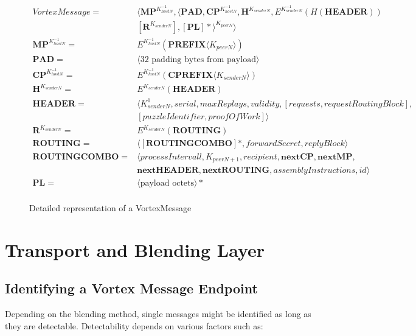 \begin{figure*}[!h]
	\begin{align}
VortexMessage                = &\langle \mathbf{MP}^{K^{-1}_{hostN}}, \langle\mathbf{PAD}, \mathbf{CP}^{K^{-1}_{hostN}}, \mathbf{H}^{K_{senderN}}, E^{K^{-1}_{senderN}}\left(H\left(\mathbf{HEADER}\right)\right)  \nonumber \\
                               & \left[\mathbf{R}^{K_{senderN}}\right], \left[\mathbf{PL}\right]*\rangle^{K_{peerN}} \rangle\label{eq:vortexMessage}\\ 
\mathbf{MP}^{K^{-1}_{hostN}}  = &E^{K^{-1}_{hostN}}\left(\mathbf{PREFIX}\langle K_{peerN}\rangle \right)\\ 
\mathbf{PAD}                 = &\langle \text{32 padding bytes from payload} \rangle\\ 
\mathbf{CP}^{K^{-1}_{hostN}} = &E^{K^{-1}_{hostN}}\left(\mathbf{CPREFIX}\langle K_{senderN}\rangle \right)\\ 
\mathbf{H}^{K_{senderN}}     = &E^{K_{senderN}}\left(\mathbf{HEADER}\right)\\  
\mathbf{HEADER} 		     = &\langle K^{1}_{senderN}, serial, maxReplays, validity, [requests, requestRoutingBlock],\nonumber\\ 
                               & [puzzleIdentifier, proofOfWork] \rangle \\  
\mathbf{R}^{K_{senderN}}     = & E^{K_{senderN}}\left(\mathbf{ROUTING}\right)\\ 
\mathbf{ROUTING}		     = & \langle [ \mathbf{ROUTINGCOMBO} ] *, forwardSecret, replyBlock \rangle\\  
\mathbf{ROUTINGCOMBO}        = & \langle processIntervall, K_{peerN+1}, recipient, \mathbf{nextCP}, \mathbf{nextMP}, \nonumber \\
                               & \mathbf{nextHEADER}, \mathbf{nextROUTING}, assemblyInstructions, id \rangle\\
\mathbf{PL}                  = &\langle \text{payload octets} \rangle *\\ 
	\end{align}
	\captionsetup{labelformat=empty}
	\caption{Detailed representation of a VortexMessage}
\end{figure*}

\section{Transport and Blending Layer}

\subsection{Identifying a Vortex Message Endpoint}
Depending on the blending method, single messages might be identified as long as they are detectable. Detectability depends on various factors such as:

